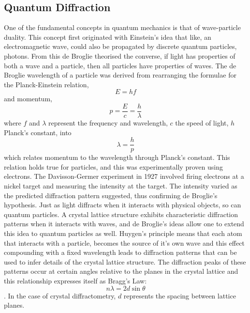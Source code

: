 \documentclass[11pt, oneside]{article}   	%
\begin{document}
\subsection{Quantum Diffraction}
One of the fundamental concepts in quantum mechanics is that of wave-particle duality. This concept first originated with Einstein's idea that like, an electromagnetic wave, could also be propagated by discrete quantum particles, photons. From this de Broglie theorised the converse, if light has properties of both a wave and a particle, then all particles have properties of waves. The de Broglie wavelength of a particle was derived from rearranging the formulae for the Planck-Einstein relation, \[E=hf\] and momentum, \[p=\frac{E}{c}=\frac{h}{\lambda}\] where $f$ and $\lambda$ represent the frequency and wavelength, $c$ the speed of light, $h$ Planck's constant, into \[\lambda=\frac{h}{p}\] which relates momentum to the wavelength through Planck's constant. This relation holds true for particles, and this was experimentally proven using electrons. The Davisson-Germer experiment in 1927 involved firing electrons at a nickel target and measuring the intensity at the target. The intensity varied as the predicted diffraction pattern suggested, thus confirming de Broglie's hypothesis. Just as light diffracts when it interacts with physical objects, so can quantum particles.
A crystal lattice structure exhibits characteristic diffraction patterns when it interacts with waves, and de Broglie's ideas allow one to extend this idea to quantum particles as well. Huygen's principle means that each atom that interacts with a particle, becomes the source of it's own wave and this effect compounding with a fixed wavelength leads to diffraction patterns that can be used to infer details of the crystal lattice structure. The diffraction peaks of these patterns occur at certain angles relative to the planes in the crystal lattice and this relationship expresses itself as Bragg's Law: \[n\lambda=2d\sin{\theta}\]. In the case of crystal diffractometry, $d$ represents the spacing between lattice planes.\cite{Handout}\cite{Diffraction_Xray}
\end{document}
